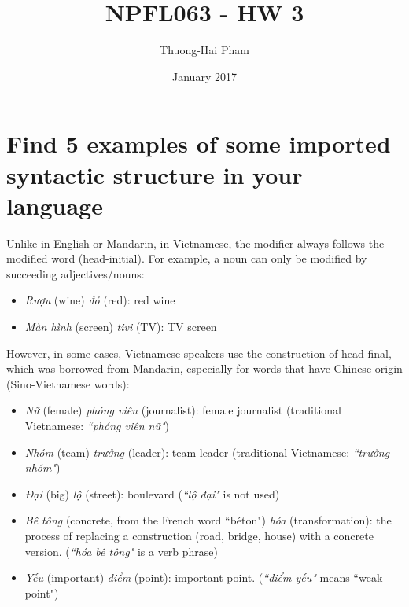 \documentclass{article}
\title{NPFL063 - HW 3}
\author{Thuong-Hai Pham}
\date{January 2017}
\begin{document}
\maketitle

\section*{Find 5 examples of some imported syntactic structure in your language}

Unlike in English or Mandarin, in Vietnamese, the modifier always follows the modified word (head-initial). For example, a noun can only be modified by succeeding adjectives/nouns:

\begin{itemize}
    \item \textit{Rượu} (wine) \textit{đỏ} (red): red wine
    \item \textit{Màn hình} (screen) \textit{tivi} (TV): TV screen
\end{itemize}

However, in some cases, Vietnamese speakers use the construction of head-final, which was borrowed from Mandarin, especially for words that have Chinese origin (Sino-Vietnamese words):

\begin{itemize}
    \item \textit{Nữ} (female) \textit{phóng viên} (journalist): female journalist (traditional Vietnamese: \textit{``phóng viên nữ"})
    \item \textit{Nhóm} (team) \textit{trưởng} (leader): team leader (traditional Vietnamese: \textit{``trưởng nhóm"})
    \item \textit{Đại} (big) \textit{lộ} (street): boulevard (\textit{``lộ đại" } is  not used)
    \item \textit{Bê tông} (concrete, from the French word ``béton") \textit{hóa} (transformation): the process of replacing a construction (road, bridge, house) with a concrete version. (\textit{``hóa bê tông" } is  a verb phrase)
    \item \textit{Yếu} (important) \textit{điểm} (point): important point. (\textit{``điểm yếu"}  means ``weak point")
\end{itemize}
\end{document}
